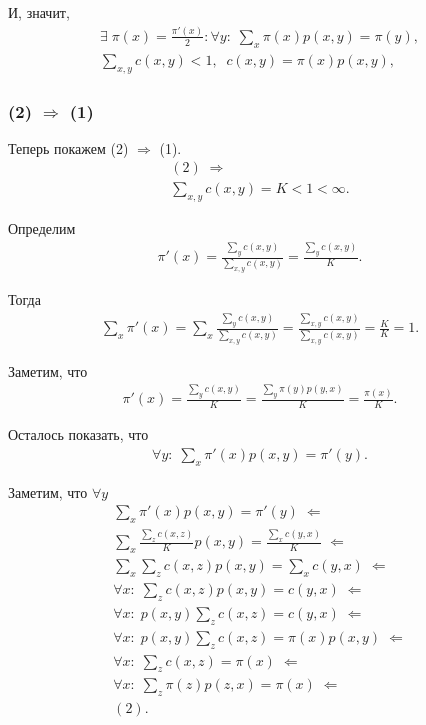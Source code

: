 \documentclass[10pt]{article}
\begin{document}
И, значит,
\begin{gather*}
  \exists \; \pi(x) = \frac{\pi'(x)}{2}: \forall y: \; \sum\limits_{x} \pi(x) p(x, y) = \pi(y),  \\
  \sum\limits_{x, y} c(x, y) < 1, \;\; c(x, y) = \pi(x) p(x, y),
\end{gather*}

\medskip

\subsubsection{(2) $\Rightarrow$ (1)}

Теперь покажем (2) $\Rightarrow$ (1).
\begin{gather*}
  (2) \; \Rightarrow \\
  \sum\limits_{x, y} c(x, y) = K < 1 < \infty.
\end{gather*}

Определим
\begin{gather*}
  \pi'(x) = \frac{\sum\limits_{y} c(x, y)}{\sum\limits_{x, y} c(x, y)} = \frac{\sum\limits_{y} c(x, y)}{K}.
\end{gather*}

Тогда
\begin{gather*}
  \sum\limits_{x} \pi'(x) = \sum\limits_{x} \frac{\sum\limits_{y} c(x, y)}{\sum\limits_{x, y} c(x, y)} = \frac{\sum\limits_{x, y} c(x, y)}{\sum\limits_{x, y} c(x, y)} = \frac{K}{K} = 1.
\end{gather*}

Заметим, что
\begin{gather*}
  \pi'(x) = \frac{\sum\limits_{y} c(x, y)}{K} = \frac{\sum\limits_{y} \pi(y) p(y, x)}{K} = \frac{\pi(x)}{K}.
\end{gather*}

Осталось показать, что
\begin{gather*}
  \forall y: \; \sum\limits_{x} \pi'(x) p(x, y) = \pi'(y).
\end{gather*}

Заметим, что $\forall y$
\begin{gather*}
  \sum\limits_{x} \pi'(x) p(x, y) = \pi'(y) \; \Leftarrow \\
  \sum\limits_{x} \frac{\sum\limits_{z} c(x, z)}{K} p(x, y) = \frac{\sum\limits_{x} c(y, x)}{K} \; \Leftarrow \\
  \sum\limits_{x} \sum\limits_{z} c(x, z) p(x, y) = \sum\limits_{x} c(y, x) \; \Leftarrow \\
  \forall x: \; \sum\limits_{z} c(x, z) p(x, y) = c(y, x) \; \Leftarrow \\
  \forall x: \; p(x, y) \sum\limits_{z} c(x, z) = c(y, x) \; \Leftarrow \\
  \forall x: \; p(x, y) \sum\limits_{z} c(x, z) = \pi(x) p(x, y) \; \Leftarrow \\
  \forall x: \; \sum\limits_{z} c(x, z) = \pi(x) \; \Leftarrow \\
  \forall x: \; \sum\limits_{z} \pi(z) p(z, x) = \pi(x) \; \Leftarrow \\
  (2).
\end{gather*}
\end{document}
